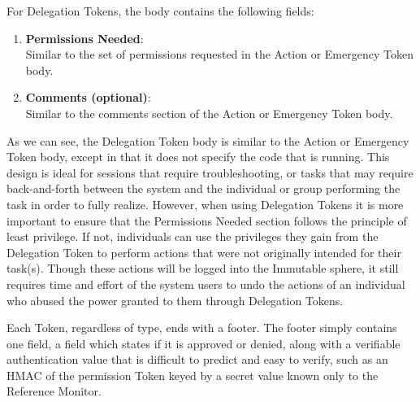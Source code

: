 For Delegation Tokens, the body contains the following fields:
\begin{enumerate}
\item \textbf{Permissions Needed}:\\
Similar to the set of permissions requested in the Action or Emergency Token
body.
\item \textbf{Comments (optional)}:\\
Similar to the comments section of the Action or Emergency Token body.
\end{enumerate}

As we can see, the Delegation Token body is similar to the Action or Emergency
Token body, except in that it does not specify the code that is running. This
design is ideal for sessions that require troubleshooting, or tasks that may
require back-and-forth between the system and the individual or group performing
the task in order to fully realize. However, when using Delegation Tokens it is
more important to ensure that the Permissions Needed section follows the
principle of least privilege. If not, individuals can use the privileges they
gain from the Delegation Token to perform actions that were not originally
intended for their task(s). Though these actions will be logged into the
Immutable sphere, it still requires time and effort of the system users to undo
the actions of an individual who abused the power granted to them through
Delegation Tokens.

Each Token, regardless of type, ends with a footer. The footer simply contains
one field, a field which states if it is approved or denied, along with a
verifiable authentication value that is difficult to predict and easy to verify,
such as an HMAC of the permission Token keyed by a secret value known only to
the Reference Monitor.

